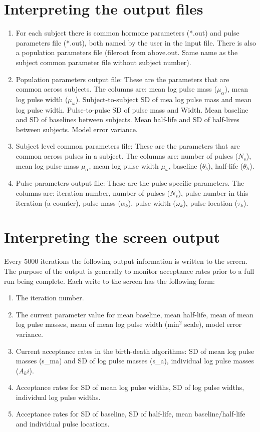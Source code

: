 \documentclass[12pt, oneside]{article}   	%
\begin{document}
\section{Interpreting the output files}
\begin{enumerate}
\item For each subject there is common hormone parameters (*.out) and pulse parameters file (*.out), both named by the user in the input file. There is also a population parameters file (fileroot from above.out. Same name as the subject common parameter file without subject number). 
\item Population parameters output file: These are the parameters that are common across subjects.  The columns are: mean log pulse mass ($\mu_\alpha$), mean log pulse width ($\mu_\omega$). Subject-to-subject SD of mea log pulse mass and mean log pulse width. Pulse-to-pulse SD of pulse mass and Width. Mean baseline and SD of baselines between subjects. Mean half-life and SD of half-lives between subjects. Model error variance.
\item Subject level common parameters file: These are the parameters that are common across pulses in a subject. The columns are: number of pulses ($N_s$), mean log pulse mass $\mu_{\alpha}$, mean log pulse width $\mu_{\omega}$, baseline ($\theta_b$), half-life ($\theta_h$).
\item Pulse parameters output file: These are the pulse specific parameters. The columns are:  iteration number, number of pulses ($N_s$), pulse number in this iteration (a counter), pulse mass ($\alpha_k$), pulse width ($\omega_k$), pulse location ($\tau_k$).
\end{enumerate}

\section{Interpreting the screen output}
Every 5000 iterations the following output information is written to the screen. The purpose of the output is generally to monitor acceptance rates prior to a full run being complete.  Each write to the screen has the following form:
\begin{enumerate}
\item The iteration number.
\item The current parameter value for mean baseline, mean half-life, mean of mean log pulse masses, mean of mean log pulse width (min$^2$ scale),  model error variance.
\item Current acceptance rates in the birth-death algorithms: SD of mean log pulse masses (s\_ma) and SD of log pulse masses (s\_a), individual log pulse masses ($A_ki$).
\item Acceptance rates for SD of mean log pulse widths, SD of log pulse widths, individual log pulse widths.
\item Acceptance rates for SD of baseline, SD of half-life, mean baseline/half-life and individual pulse locations.
\end{enumerate}
\end{document}
